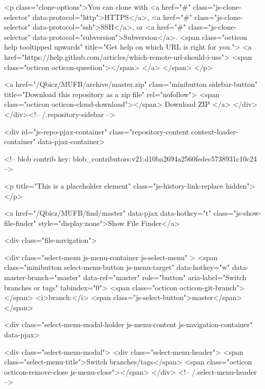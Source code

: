<p class="clone-options">You can clone with
      <a href="#" class="js-clone-selector" data-protocol="http">HTTPS</a>,
      <a href="#" class="js-clone-selector" data-protocol="ssh">SSH</a>,
      or <a href="#" class="js-clone-selector" data-protocol="subversion">Subversion</a>.
  <span class="octicon help tooltipped upwards" title="Get help on which URL is right for you.">
    <a href="https://help.github.com/articles/which-remote-url-should-i-use">
    <span class="octicon octicon-question"></span>
    </a>
  </span>
</p>



              <a href="/Qbicz/MUFB/archive/master.zip"
                 class="minibutton sidebar-button"
                 title="Download this repository as a zip file"
                 rel="nofollow">
                <span class="octicon octicon-cloud-download"></span>
                Download ZIP
              </a>
            </div>
        </div><!-- /.repository-sidebar -->

        <div id="js-repo-pjax-container" class="repository-content context-loader-container" data-pjax-container>
          


<!-- blob contrib key: blob_contributors:v21:d10ba2694a2560fedec5738931c10c24 -->

<p title="This is a placeholder element" class="js-history-link-replace hidden"></p>

<a href="/Qbicz/MUFB/find/master" data-pjax data-hotkey="t" class="js-show-file-finder" style="display:none">Show File Finder</a>

<div class="file-navigation">
  

<div class="select-menu js-menu-container js-select-menu" >
  <span class="minibutton select-menu-button js-menu-target" data-hotkey="w"
    data-master-branch="master"
    data-ref="master"
    role="button" aria-label="Switch branches or tags" tabindex="0">
    <span class="octicon octicon-git-branch"></span>
    <i>branch:</i>
    <span class="js-select-button">master</span>
  </span>

  <div class="select-menu-modal-holder js-menu-content js-navigation-container" data-pjax>

    <div class="select-menu-modal">
      <div class="select-menu-header">
        <span class="select-menu-title">Switch branches/tags</span>
        <span class="octicon octicon-remove-close js-menu-close"></span>
      </div> <!-- /.select-menu-header -->

